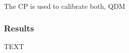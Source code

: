 \documentclass[hess, manuscript]{copernicus}
\begin{document}
The CP is used to calibrate both, QDM 
\subsubsection{Results}

\conclusions  %
TEXT












\appendix
\section{}    %

\subsection{}     %


\noappendix       %



\end{document}
